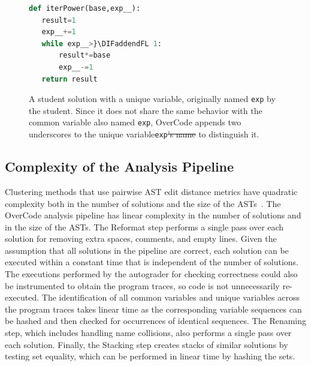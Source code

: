 \documentclass[12pt,twoside]{mitthesis}
\providecommand{\DIFaddtex}[1]{{\protect\color{blue}\uwave{#1}}} %
\providecommand{\DIFdeltex}[1]{{\protect\color{red}\sout{#1}}}                      %
\providecommand{\DIFaddFL}[1]{\DIFadd{#1}} %
\providecommand{\DIFdelFL}[1]{\DIFdel{#1}} %
\providecommand{\DIFaddbeginFL}{} %
\providecommand{\DIFaddendFL}{} %
\providecommand{\DIFdelbeginFL}{} %
\providecommand{\DIFdelendFL}{} %
\providecommand{\DIFadd}[1]{\texorpdfstring{\DIFaddtex{#1}}{#1}} %
\providecommand{\DIFdel}[1]{\texorpdfstring{\DIFdeltex{#1}}{}} %
\begin{document}
\begin{figure}
\begin{minipage}{0.45\linewidth}
\begin{lstlisting}[basicstyle=\linespread{1.0}\ttfamily\footnotesize,language=python,linebackgroundcolor={\lstcolorlines[gray!20]{1,3,4,6}}]
def iterPower(base,exp__):
   result=1
   exp__+=1
   while exp__>}\DIFaddendFL 1:
       result*=base
       exp__-=1
   return result
\end{lstlisting}
\end{minipage}
\caption{A student solution with a unique variable, originally named \texttt{exp} by the student. Since it does not share the same behavior with the common variable also named \texttt{exp}, OverCode appends two underscores to the \DIFaddbeginFL \DIFaddFL{name of the }\DIFaddendFL unique variable\DIFaddbeginFL \DIFaddFL{, }\DIFaddendFL \texttt{exp}\DIFdelbeginFL \DIFdelFL{'s name }\DIFdelendFL \DIFaddbeginFL \DIFaddFL{, }\DIFaddendFL to distinguish it.}
\label{fig:lastone}
\end{figure}



\subsection{Complexity of the Analysis Pipeline}\label{complexity}
Clustering methods that use pairwise AST edit distance metrics have quadratic complexity both in the number of solutions and the size of the ASTs~\cite{MOOCshop}. The OverCode analysis pipeline has linear complexity in the number of solutions and in the size of the ASTs. The Reformat step performs a single pass over each solution for removing extra spaces, comments, and empty lines. Given the assumption that all solutions in the pipeline are correct, each solution can be executed within a constant time that is independent of the number of solutions. The executions performed by the autograder for checking correctness could also be instrumented to obtain the program traces, so code is not unnecessarily re-executed. The identification of all common variables and unique variables across the program traces takes linear time as the corresponding variable sequences can be hashed and then checked for occurrences of identical sequences. The Renaming step, which includes handling name collisions, also performs a single pass over each solution. Finally, the Stacking step creates stacks of similar solutions by testing set equality, which can be performed in linear time by hashing the sets.
\end{document}
